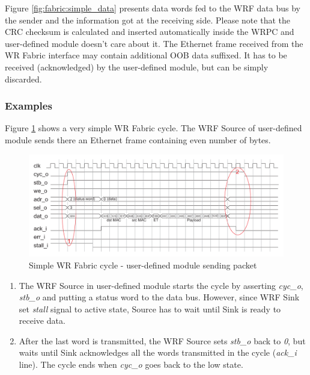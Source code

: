 Figure \ref{fig:fabric:simple_data} presents data words fed to the WRF
data bus by the sender and the information got at the receiving side. Please
note that the CRC checksum is calculated and inserted automatically inside the
WRPC and user-defined module doesn't care about it. The Ethernet frame received
from the WR Fabric interface may contain additional OOB data suffixed. It has to
be received (acknowledged) by the user-defined module, but can be simply discarded.

\subsubsection{Examples}
Figure \ref{fig:fabric:simple_tx} shows a very simple WR Fabric cycle. The WRF
Source of user-defined module sends there an Ethernet frame containing even
number of bytes.

\begin{figure}[ht]
  \begin{center}
    \includegraphics[width=\textwidth]{fig/basic_wrf_cycle_simple.pdf}
    \caption{Simple WR Fabric cycle - user-defined module sending packet}
    \label{fig:fabric:simple_tx}
  \end{center}
\end{figure}

\begin{enumerate}
  \item The WRF Source in user-defined module starts the cycle by asserting
    \emph{cyc\_o}, \emph{stb\_o} and putting a status word to the data bus.
    However, since WRF Sink set \emph{stall} signal to active state, Source has
    to wait until Sink is ready to receive data.
  \item After the last word is transmitted, the WRF Source sets \emph{stb\_o} back
    to \emph{0}, but waits until Sink acknowledges all the words transmitted in
    the cycle (\emph{ack\_i} line). The cycle ends when \emph{cyc\_o} goes back
    to the low state.
\end{enumerate}

